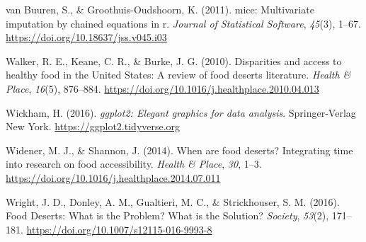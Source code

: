 \documentclass[
  letterpaper,
  number,
  review,
  3p]{elsarticle}
\newlength{\cslhangindent}
\newenvironment{CSLReferences}[2] %
 {\begin{list}{}{%
  \setlength{\itemindent}{0pt}
  \setlength{\leftmargin}{0pt}
  \setlength{\parsep}{0pt}
  \ifodd #1
   \setlength{\leftmargin}{\cslhangindent}
   \setlength{\itemindent}{-1\cslhangindent}
  \fi
  \setlength{\itemsep}{#2\baselineskip}}}
 {\end{list}}
\begin{document}
\begin{CSLReferences}{1}{0}
van Buuren, S., \& Groothuis-Oudshoorn, K. (2011). {mice}: Multivariate
imputation by chained equations in r. \emph{Journal of Statistical
Software}, \emph{45}(3), 1--67.
\url{https://doi.org/10.18637/jss.v045.i03}

Walker, R. E., Keane, C. R., \& Burke, J. G. (2010). Disparities and
access to healthy food in the {United States}: {A} review of food
deserts literature. \emph{Health \& Place}, \emph{16}(5), 876--884.
\url{https://doi.org/10.1016/j.healthplace.2010.04.013}

Wickham, H. (2016). \emph{ggplot2: Elegant graphics for data analysis}.
Springer-Verlag New York. \url{https://ggplot2.tidyverse.org}

Widener, M. J., \& Shannon, J. (2014). When are food deserts?
{Integrating} time into research on food accessibility. \emph{Health \&
Place}, \emph{30}, 1--3.
\url{https://doi.org/10.1016/j.healthplace.2014.07.011}

Wright, J. D., Donley, A. M., Gualtieri, M. C., \& Strickhouser, S. M.
(2016). Food {Deserts}: {What} is the {Problem}? {What} is the
{Solution}? \emph{Society}, \emph{53}(2), 171--181.
\url{https://doi.org/10.1007/s12115-016-9993-8}

\end{CSLReferences}
\end{document}
